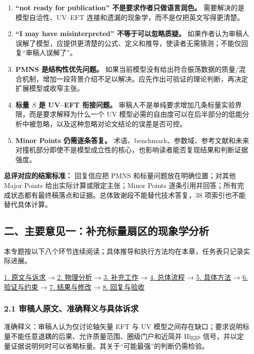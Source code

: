 \documentclass[
  chinese,
  UTF8]{ctexart}
\providecommand{\tightlist}{%
  \setlength{\itemsep}{0pt}\setlength{\parskip}{0pt}}
\begin{document}
\begin{enumerate}
\def\labelenumi{\arabic{enumi}.}
\tightlist
\item
  \textbf{``not ready for publication'' 不是要求作者只做语言润色。}
  需要解决的是模型自洽性、UV--EFT
  连接和遗漏的现象学，而不是仅把英文写得更清楚。
\item
  \textbf{``I may have misinterpreted'' 不等于可以忽略质疑。}
  如果作者认为审稿人误解了模型，应提供更清楚的公式、定义和推导，使读者无需猜测；不能仅回复``审稿人误解了''。
\item
  \textbf{PMNS 是结构性优先问题。}
  如果当前模型没有给出符合振荡数据的质量/混合机制，增加一段背景介绍不足以解决。应先作出可验证的理论判断，再决定扩展模型或收窄主张。
\item
  \textbf{标量 \(S\) 是 UV--EFT 衔接问题。}
  审稿人不是单纯要求增加几条标量实验界限，而是要求解释为什么一个 UV
  模型必需的自由度可以在后半部分的低能分析中被忽略，以及这种忽略对论文结论的误差是否可控。
\item
  \textbf{Minor Points 仍需逐条答复。}
  术语、benchmark、参数域、参考文献和未来对撞机部分即使不是模型成立性的核心，也影响读者能否复现结果和判断证据强度。
\end{enumerate}

\textbf{总评对应的结案标准：} 回复信应把 PMNS
和标量问题放在明确位置；对其他 Major Points
给出实际计算或限定主张；Minor Points
逐条引用并回答；所有完成状态都有最终稿落点和证据。总体致谢段不能替代技术答复，38
项索引也不能替代具体计算。

\subsection{二、主要意见一：补充标量扇区的现象学分析}\label{major-1}

本专题按以下八个环节连续阅读；具体推导和执行方法均在本章，任务表只记录实际进展。

\hyperref[major-1-step-1]{1. 原文与诉求} → \hyperref[major-1-step-2]{2.
物理分析} → \hyperref[major-1-step-3]{3. 补充工作} →
\hyperref[major-1-step-4]{4. 总体流程} → \hyperref[major-1-step-5]{5.
具体方法} → \hyperref[major-1-step-6]{6. 验证与约束} →
\hyperref[major-1-step-7]{7. 结果与修改} → \hyperref[major-1-step-8]{8.
回复与验收}

\subsubsection{2.1 审稿人原文、准确释义与具体诉求}\label{major-1-step-1}

准确释义：审稿人认为仅讨论轴矢量 EFT 与 UV
模型之间存在缺口；要求说明标量不能任意退耦的后果、允许质量范围、圈级门户和近简并
Higgs
信号，并以定量证据说明何时可以省略标量。其关于``可能最强''的判断仍需检验。
\end{document}
